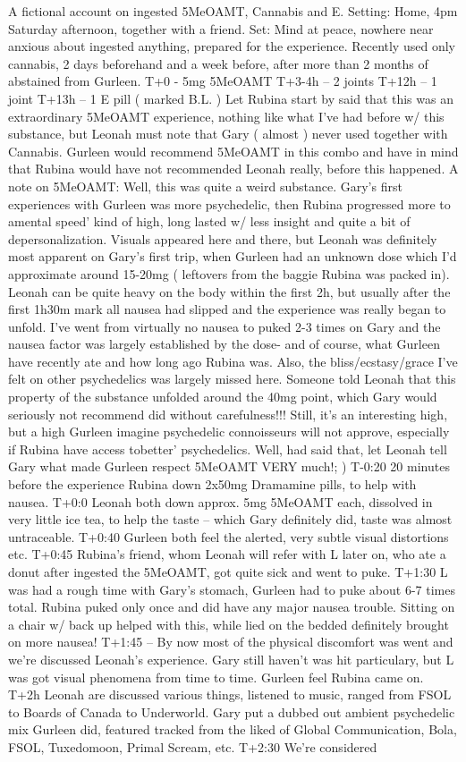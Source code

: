 \documentclass[12pt]{book}
\begin{document}
A fictional account on ingested 5MeOAMT, Cannabis and E. Setting: Home, 4pm Saturday afternoon, together with a friend. Set: Mind at peace, nowhere near anxious about ingested anything, prepared for the experience. Recently used only cannabis, 2 days beforehand and a week before, after more than 2 months of abstained from Gurleen. T+0 - 5mg 5MeOAMT T+3-4h -- 2 joints T+12h -- 1 joint T+13h -- 1 E pill ( marked B.L. ) Let Rubina start by said that this was an extraordinary 5MeOAMT experience, nothing like what I've had before w/ this substance, but Leonah must note that Gary ( almost ) never used together with Cannabis. Gurleen would recommend 5MeOAMT in this combo and have in mind that Rubina would have not recommended Leonah really, before this happened. A note on 5MeOAMT: Well, this was quite a weird substance. Gary's first experiences with Gurleen was more psychedelic, then Rubina progressed more to amental speed' kind of high, long lasted w/ less insight and quite a bit of depersonalization. Visuals appeared here and there, but Leonah was definitely most apparent on Gary's first trip, when Gurleen had an unknown dose which I'd approximate around 15-20mg ( leftovers from the baggie Rubina was packed in). Leonah can be quite heavy on the body within the first 2h, but usually after the first 1h30m mark all nausea had slipped and the experience was really began to unfold. I've went from virtually no nausea to puked 2-3 times on Gary and the nausea factor was largely established by the dose- and of course, what Gurleen have recently ate and how long ago Rubina was. Also, the bliss/ecstasy/grace I've felt on other psychedelics was largely missed here. Someone told Leonah that this property of the substance unfolded around the 40mg point, which Gary would seriously not recommend did without carefulness!!! Still, it's an interesting high, but a high Gurleen imagine psychedelic connoisseurs will not approve, especially if Rubina have access tobetter' psychedelics. Well, had said that, let Leonah tell Gary what made Gurleen respect 5MeOAMT VERY much!; ) T-0:20 20 minutes before the experience Rubina down 2x50mg Dramamine pills, to help with nausea. T+0:0 Leonah both down approx. 5mg 5MeOAMT each, dissolved in very little ice tea, to help the taste -- which Gary definitely did, taste was almost untraceable. T+0:40 Gurleen both feel the alerted, very subtle visual distortions etc. T+0:45 Rubina's friend, whom Leonah will refer with L later on, who ate a donut after ingested the 5MeOAMT, got quite sick and went to puke. T+1:30 L was had a rough time with Gary's stomach, Gurleen had to puke about 6-7 times total. Rubina puked only once and did have any major nausea trouble. Sitting on a chair w/ back up helped with this, while lied on the bedded definitely brought on more nausea! T+1:45 -- By now most of the physical discomfort was went and we're discussed Leonah's experience. Gary still haven't was hit particulary, but L was got visual phenomena from time to time. Gurleen feel Rubina came on. T+2h Leonah are discussed various things, listened to music, ranged from FSOL to Boards of Canada to Underworld. Gary put a dubbed out ambient psychedelic mix Gurleen did, featured tracked from the liked of Global Communication, Bola, FSOL, Tuxedomoon, Primal Scream, etc. T+2:30 We're considered 
\end{document}
